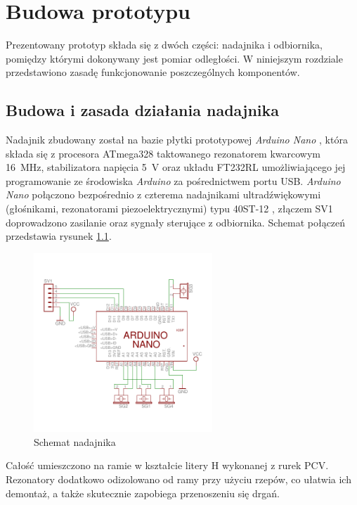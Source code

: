 
\chapter{Budowa prototypu}

Prezentowany prototyp składa się z dwóch części: nadajnika i odbiornika, pomiędzy którymi
dokonywany jest pomiar odległości. W niniejszym rozdziale przedstawiono zasadę funkcjonowanie 
poszczególnych komponentów.

\section{Budowa i zasada działania nadajnika}

Nadajnik zbudowany został na bazie płytki prototypowej \textit{Arduino Nano} \cite{bib:arduinoNano},
która składa się z procesora ATmega328 \cite{bib:atmega328} taktowanego rezonatorem kwarcowym \SI{16}{MHz},
stabilizatora napięcia \SI{5}{V} oraz układu FT232RL umożliwiającego 
jej programowanie  ze środowiska \textit{Arduino} \cite{bib:Arduino} za pośrednictwem portu USB. 
\textit{Arduino Nano} połączono 
bezpośrednio z czterema nadajnikami ultradźwiękowymi (głośnikami, rezonatorami piezoelektrycznymi) typu 40ST-12 \cite{bib:40ST12},
złączem SV1 doprowadzono zasilanie oraz sygnały sterujące z odbiornika. 
Schemat połączeń przedstawia rysunek \ref{fig:nadajnik_schemat}.

 \begin{figure}[h]
    \centering
    \includegraphics[width=0.6\textwidth, trim= 0mm 0mm 0mm 0mm,clip]{transmitter}
    \caption{Schemat nadajnika}
    \label{fig:nadajnik_schemat}
\end{figure}

Całość umieszczono na ramie w kształcie litery H wykonanej z rurek PCV.
Rezonatory dodatkowo odizolowano  od ramy przy użyciu rzepów, co ułatwia ich demontaż, a także skutecznie
zapobiega przenoszeniu się drgań. 


